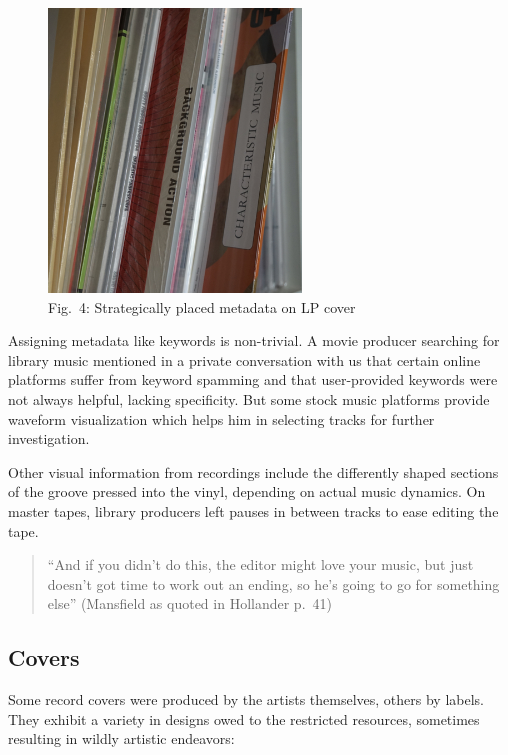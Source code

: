 \documentclass[a4paper,
fontsize=11pt,
oneside,
numbers=noperiodatend,
parskip=half-,
bibliography=totoc,
final
]{scrartcl}
\begin{document}
\begin{figure}
\centering
\includegraphics[width=0.6\textwidth]{img/Fig4.jpg}
\caption{Fig.~4: Strategically placed metadata on LP cover}
\end{figure}

Assigning metadata like keywords is non-trivial. A movie producer
searching for library music mentioned in a private conversation with us
that certain online platforms suffer from keyword spamming and that
user-provided keywords were not always helpful, lacking specificity. But
some stock music platforms provide waveform visualization which helps
him in selecting tracks for further investigation.

Other visual information from recordings include the differently shaped
sections of the groove pressed into the vinyl, depending on actual music
dynamics. On master tapes, library producers left pauses in between
tracks to ease editing the tape.

\begin{quote}
\enquote{And if you didn't do this, the editor might love your music,
but just doesn't got time to work out an ending, so he's going to go for
something else} (Mansfield as quoted in Hollander p.~41)
\end{quote}

\hypertarget{covers}{%
\subsection{Covers}\label{covers}}

Some record covers were produced by the artists themselves, others by
labels. They exhibit a variety in designs owed to the restricted
resources, sometimes resulting in wildly artistic endeavors:
\end{document}
